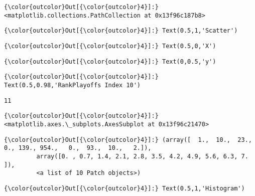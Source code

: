 \documentclass[11pt]{article}
\begin{document}
\begin{Verbatim}[commandchars=\\\{\}]
{\color{outcolor}Out[{\color{outcolor}4}]:} <matplotlib.collections.PathCollection at 0x13f96c187b8>
\end{Verbatim}
            
\begin{Verbatim}[commandchars=\\\{\}]
{\color{outcolor}Out[{\color{outcolor}4}]:} Text(0.5,1,'Scatter')
\end{Verbatim}
            
\begin{Verbatim}[commandchars=\\\{\}]
{\color{outcolor}Out[{\color{outcolor}4}]:} Text(0.5,0,'X')
\end{Verbatim}
            
\begin{Verbatim}[commandchars=\\\{\}]
{\color{outcolor}Out[{\color{outcolor}4}]:} Text(0,0.5,'y')
\end{Verbatim}
            
\begin{Verbatim}[commandchars=\\\{\}]
{\color{outcolor}Out[{\color{outcolor}4}]:} Text(0.5,0.98,'RankPlayoffs Index 10')
\end{Verbatim}
            
    \begin{Verbatim}[commandchars=\\\{\}]
11

    \end{Verbatim}

\begin{Verbatim}[commandchars=\\\{\}]
{\color{outcolor}Out[{\color{outcolor}4}]:} <matplotlib.axes.\_subplots.AxesSubplot at 0x13f96c21470>
\end{Verbatim}
            
\begin{Verbatim}[commandchars=\\\{\}]
{\color{outcolor}Out[{\color{outcolor}4}]:} (array([  1.,  10.,  23.,   0., 139., 954.,   0.,  93.,  10.,   2.]),
         array([0. , 0.7, 1.4, 2.1, 2.8, 3.5, 4.2, 4.9, 5.6, 6.3, 7. ]),
         <a list of 10 Patch objects>)
\end{Verbatim}
            
\begin{Verbatim}[commandchars=\\\{\}]
{\color{outcolor}Out[{\color{outcolor}4}]:} Text(0.5,1,'Histogram')
\end{Verbatim}
            
\end{document}
